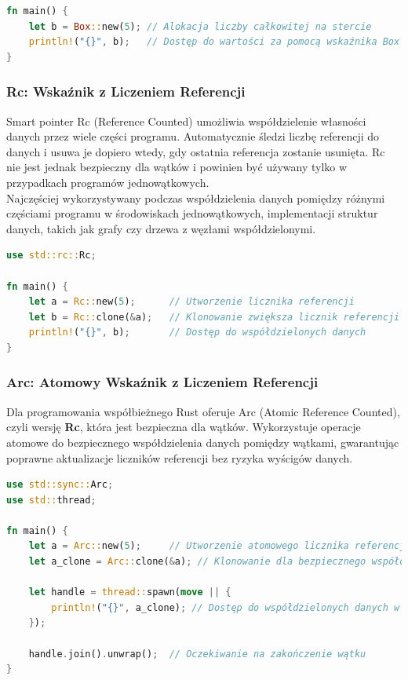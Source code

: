 \begin{lstlisting}[language=Rust, caption=Inteligentny wskaźnik Box, label=box_smart_pointer]
fn main() {
    let b = Box::new(5); // Alokacja liczby całkowitej na stercie
    println!("{}", b);   // Dostęp do wartości za pomocą wskaźnika Box
}
\end{lstlisting}

\subsubsection{Rc: Wskaźnik z Liczeniem Referencji}
\label{RC}
Smart pointer Rc (Reference Counted) umożliwia współdzielenie własności danych przez wiele części programu. Automatycznie śledzi liczbę referencji do danych i usuwa je dopiero wtedy, gdy ostatnia referencja zostanie usunięta. Rc nie jest jednak bezpieczny dla wątków i powinien być używany tylko w przypadkach programów jednowątkowych.\\
Najczęściej wykorzystywany podczas współdzielenia danych pomiędzy różnymi częściami programu w środowiskach jednowątkowych, implementacji struktur danych, takich jak grafy czy drzewa z węzłami współdzielonymi.

\begin{lstlisting}[language=Rust, caption=Inteligentny wskaźnik RC, label=rc_smart_pointer]
use std::rc::Rc;

fn main() {
    let a = Rc::new(5);      // Utworzenie licznika referencji
    let b = Rc::clone(&a);   // Klonowanie zwiększa licznik referencji
    println!("{}", b);       // Dostęp do współdzielonych danych
}
\end{lstlisting}

\subsubsection{Arc: Atomowy Wskaźnik z Liczeniem Referencji}
\label{ARC}
Dla programowania współbieżnego Rust oferuje Arc (Atomic Reference Counted), czyli wersję \textbf{Rc}, która jest bezpieczna dla wątków. Wykorzystuje operacje atomowe do bezpiecznego współdzielenia danych pomiędzy wątkami, gwarantując poprawne aktualizacje liczników referencji bez ryzyka wyścigów danych.

\begin{lstlisting}[language=Rust, caption=Inteligentny wskaźnik Arc, label=arc_smart_pointer]
use std::sync::Arc;
use std::thread;

fn main() {
    let a = Arc::new(5);     // Utworzenie atomowego licznika referencji
    let a_clone = Arc::clone(&a); // Klonowanie dla bezpiecznego współdzielenia

    let handle = thread::spawn(move || {
        println!("{}", a_clone); // Dostęp do współdzielonych danych w nowym wątku
    });

    handle.join().unwrap();  // Oczekiwanie na zakończenie wątku
}
\end{lstlisting}
